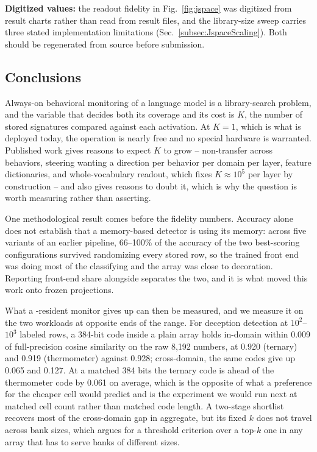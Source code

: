 \textbf{Digitized values:} the readout fidelity in
Fig.~\ref{fig:jspace} was digitized from result charts rather than read
from result files, and the library-size sweep carries three stated
implementation limitations (Sec.~\ref{subsec:JspaceScaling}). Both
should be regenerated from source before submission.

\subsection{Conclusions}
\label{subsec:Conclusions}
Always-on behavioral monitoring of a language model is a library-search
problem, and the variable that decides both its coverage and its cost is
$K$, the number of stored signatures compared against each activation. At
$K=1$, which is what is deployed today, the operation is nearly free and
no special hardware is warranted. Published work gives reasons to expect
$K$ to grow -- non-transfer across behaviors, steering wanting a
direction per behavior per domain per layer, feature dictionaries, and
whole-vocabulary readout, which fixes $K\!\approx\!10^{5}$ per layer by
construction -- and also gives reasons to doubt it, which is why the
question is worth measuring rather than asserting.

One methodological result comes before the fidelity numbers. Accuracy
alone does not establish that a memory-based detector is using its
memory: across five variants of an earlier pipeline, 66--100\% of the
accuracy of the two best-scoring configurations survived randomizing
every stored row, so the trained front end was doing most of the
classifying and the array was close to decoration. Reporting front-end
share alongside \auroc separates the two, and it is what moved this work
onto frozen projections.

What a \cam-resident monitor gives up can then be measured, and we
measure it on the two workloads at opposite ends of the range. For
deception detection at $10^{2}$--$10^{3}$ labeled rows, a 384-bit code
inside a plain array holds in-domain \auroc within 0.009 of
full-precision cosine similarity on the raw 8{,}192 numbers, at 0.920
(\signrp ternary) and 0.919 (thermometer) against 0.928; cross-domain,
the same codes give up 0.065 and 0.127. At a matched 384 bits the
ternary code is ahead of the thermometer code by 0.061 on average, which
is the opposite of what a preference for the cheaper cell would predict
and is the experiment we would run next at matched cell count rather
than matched code length. A two-stage shortlist recovers most of the
cross-domain gap in aggregate, but its fixed $k$ does not travel across
bank sizes, which argues for a threshold criterion over a top-$k$ one in
any array that has to serve banks of different sizes.

